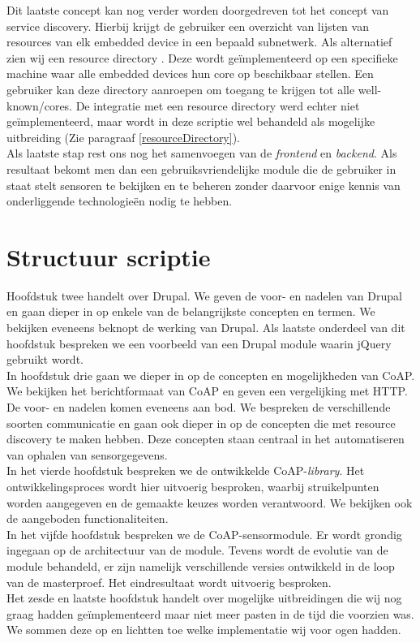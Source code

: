 Dit laatste concept kan nog verder worden doorgedreven tot het concept van service discovery. Hierbij krijgt de gebruiker een overzicht van lijsten van resources van elk embedded device in een bepaald subnetwerk. Als alternatief zien wij een resource directory \cite{coapDraft, coapDiscovery}. Deze wordt ge\"{i}mplementeerd op een specifieke machine waar alle embedded devices hun core op beschikbaar stellen. Een gebruiker kan deze directory aanroepen om toegang te krijgen tot alle well-known/cores. De integratie met een resource directory werd echter niet ge\"{i}mplementeerd, maar wordt in deze scriptie wel behandeld als mogelijke uitbreiding (Zie paragraaf \ref{resourceDirectory}).\\
Als laatste stap rest ons nog het samenvoegen van de \textit{frontend} en \textit{backend}. Als resultaat bekomt men dan een gebruiksvriendelijke module die de gebruiker in staat stelt sensoren te bekijken en te beheren zonder daarvoor enige kennis van onderliggende technologie\"{e}n nodig te hebben.


\section{Structuur scriptie}

Hoofdstuk twee handelt over Drupal. We geven de voor- en nadelen van Drupal en gaan dieper in op enkele van de belangrijkste concepten en termen. We bekijken eveneens beknopt de werking van Drupal. Als laatste onderdeel van dit hoofdstuk bespreken we een voorbeeld van een Drupal module waarin jQuery gebruikt wordt.\\

In hoofdstuk drie gaan we dieper in op de concepten en mogelijkheden van CoAP. We bekijken het berichtformaat van CoAP en geven een vergelijking met HTTP. De voor- en nadelen komen eveneens aan bod. We bespreken de verschillende soorten communicatie en gaan ook dieper in op de concepten die met resource discovery te maken hebben. Deze concepten staan centraal in het automatiseren van ophalen van sensorgegevens.\\

In het vierde hoofdstuk bespreken we de ontwikkelde CoAP-\textit{library}. Het ontwikkelingsproces wordt hier uitvoerig besproken, waarbij struikelpunten worden aangegeven en de gemaakte keuzes worden verantwoord. We bekijken ook de aangeboden functionaliteiten.\\

In het vijfde hoofdstuk bespreken we de CoAP-sensormodule. Er wordt grondig ingegaan op de architectuur van de module. Tevens wordt de evolutie van de module behandeld, er zijn namelijk verschillende versies ontwikkeld in de loop van de masterproef. Het eindresultaat wordt uitvoerig besproken.\\

Het zesde en laatste hoofdstuk handelt over mogelijke uitbreidingen die wij nog graag hadden ge\"{i}mplementeerd maar niet meer pasten in de tijd die voorzien was. We sommen deze op en lichtten toe welke implementatie wij voor ogen hadden.











